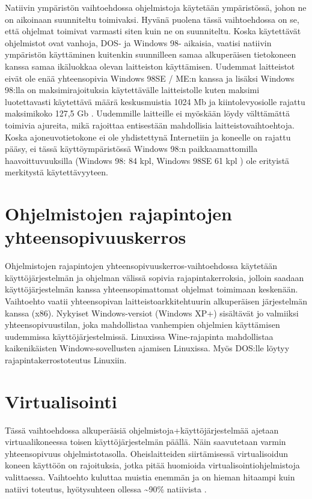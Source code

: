 \documentclass[11pt,a4paper,oneside,article]{memoir}
\begin{document}
Natiivin ympäristön vaihtoehdossa ohjelmistoja käytetään ympäristössä, johon ne on aikoinaan suunniteltu toimivaksi. Hyvänä puolena tässä vaihtoehdossa on se, että ohjelmat toimivat varmasti siten kuin ne on suunniteltu. Koska käytettävät ohjelmistot ovat vanhoja, DOS- ja Windows 98- aikaisia, vaatisi natiivin ympäristön käyttäminen kuitenkin suunnilleen samaa alkuperäisen tietokoneen kanssa samaa ikäluokkaa olevan laitteiston käyttämisen. Uudemmat laitteistot eivät ole enää yhteensopivia Windows 98SE / ME:n kanssa ja lisäksi Windows 98:lla on maksimirajoituksia käytettävälle laitteistolle kuten maksimi luotettavasti käytettävä määrä keskusmuistia 1024 Mb ja kiintolevyosiolle rajattu maksimikoko 127,5 Gb \cite{win98:maxspecs}. Uudemmille laitteille ei myöskään löydy välttämättä toimivia ajureita, mikä rajoittaa entisestään mahdollisia laitteistovaihtoehtoja. Koska ajoneuvotietokone ei ole yhdistettynä Internetiin ja koneelle on rajattu pääsy, ei tässä käyttöympäristössä Windows 98:n paikkaamattomilla haavoittuvuuksilla (Windows 98: 84 kpl, Windows 98SE 61 kpl \cite{win98:vulns}) ole erityistä merkitystä käytettävyyteen.

\section{Ohjelmistojen rajapintojen
yhteensopivuuskerros}

Ohjelmistojen rajapintojen yhteensopivuuskerros-vaihtoehdossa  käytetään käyttöjärjestelmän ja ohjelman välissä sopivia rajapintakerroksia, jolloin saadaan käyttöjärjestelmän kanssa yhteensopimattomat ohjelmat toimimaan keskenään. Vaihtoehto vaatii yhteensopivan laitteistoarkkitehtuurin alkuperäisen järjestelmän kanssa (x86). Nykyiset Windows-versiot (Windows XP+) sisältävät jo valmiiksi yhteensopivuustilan, joka mahdollistaa vanhempien ohjelmien käyttämisen uudemmissa käyttöjärjestelmissä. Linuxissa Wine-rajapinta mahdollistaa kaikenikäisten Windows-sovellusten ajamisen Linuxissa. Myös DOS:lle löytyy rajapintakerrostoteutus Linuxiin.

\section{Virtualisointi}

Tässä vaihtoehdossa alkuperäisiä ohjelmistoja+käyttöjärjestelmää ajetaan virtuaalikoneessa toisen käyttöjärjestelmän päällä. Näin saavutetaan varmin yhteensopivuus ohjelmistotasolla. Oheislaitteiden siirtämisessä virtualisoidun koneen käyttöön on rajoituksia, jotka pitää huomioida virtualisointiohjelmistoja valittaessa. Vaihtoehto kuluttaa muistia enemmän ja on hieman hitaampi kuin natiivi toteutus, hyötysuhteen ollessa \textasciitilde{}90\%  natiivista \cite{virtnat_anadtech}. 
\end{document}
